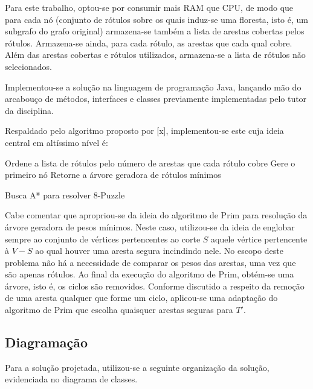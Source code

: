 \documentclass[12pt]{article}
\begin{document}
		Para este trabalho, optou-se por consumir mais RAM que CPU, de modo que para cada nó (conjunto de rótulos sobre os quais induz-se uma floresta, isto é, um subgrafo do grafo original) armazena-se também a lista de arestas cobertas pelos rótulos. Armazena-se ainda, para cada rótulo, as arestas que cada qual cobre. Além das arestas cobertas e rótulos utilizados, armazena-se a lista de rótulos não selecionados.

		Implementou-se a solução na linguagem de programação Java, lançando mão do arcabouço de métodos, interfaces e classes previamente implementadas pelo tutor da disciplina.

		Respaldado pelo algoritmo proposto por [x], implementou-se este cuja ideia central em altíssimo nível é:

		\begin{algorithm}[H]
			\SetAlgoLined
			Ordene a lista de rótulos pelo número de arestas que cada rótulo cobre\;
			Gere o primeiro nó\;
			Retorne a árvore geradora de rótulos mínimos\;
			\caption{Busca A* para resolver 8-Puzzle}
		\end{algorithm}

		Cabe comentar que apropriou-se da ideia do algoritmo de Prim para resolução da árvore geradora de pesos mínimos. Neste caso, utilizou-se da ideia de englobar sempre ao conjunto de vértices pertencentes ao corte $S$ aquele vértice pertencente à $V - S$ ao qual houver uma aresta segura incindindo nele. No escopo deste problema não há a necessidade de comparar os pesos das arestas, uma vez que são apenas rótulos. Ao final da execução do algoritmo de Prim, obtém-se uma árvore, isto é, os ciclos são removidos. Conforme discutido a respeito da remoção de uma aresta qualquer que forme um ciclo, aplicou-se uma adaptação do algoritmo de Prim que escolha quaisquer arestas seguras para $T'$.

	\subsection{Diagramação}\label{sec:diagramacao}

		Para a solução projetada, utilizou-se a seguinte organização da solução, evidenciada no diagrama de classes.
\end{document}
